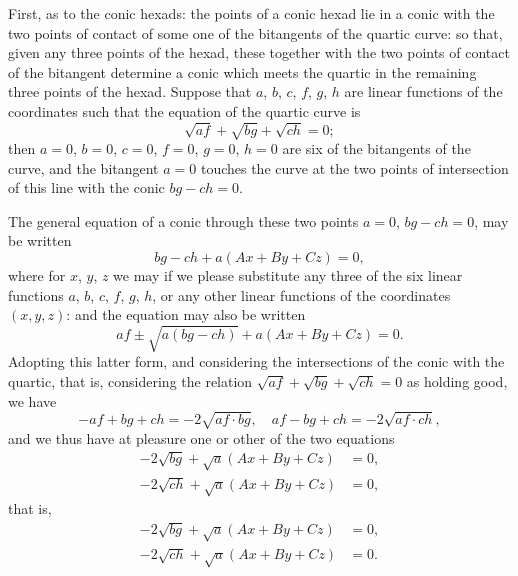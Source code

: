 \documentclass[11pt,a4paper]{article}
\begin{document}
\clearpage
First, as to the conic hexads: the points of a conic hexad lie in a conic with the two points of contact of some one of the bitangents of the quartic curve: so that, given any three points of the hexad, these together with the two points of contact of the bitangent determine a conic which meets the quartic in the remaining three points of the hexad. Suppose that $a$, $b$, $c$, $f$, $g$, $h$ are linear functions of the coordinates such that the equation of the quartic curve is
\[
\sqrt{af} + \sqrt{bg} + \sqrt{ch} = 0;
\]
then $a = 0$, $b = 0$, $c = 0$, $f = 0$, $g = 0$, $h = 0$ are six of the bitangents of the curve, and the bitangent $a = 0$ touches the curve at the two points of intersection of this line with the conic $bg - ch = 0$.

The general equation of a conic through these two points $a = 0$, $bg - ch = 0$, may be written
\[
bg - ch + a(Ax + By + Cz) = 0,
\]
where for $x$, $y$, $z$ we may if we please substitute any three of the six linear functions $a$, $b$, $c$, $f$, $g$, $h$, or any other linear functions of the coordinates $(x, y, z)$: and the equation may also be written
\[
af \pm \sqrt{a(bg - ch)} + a(Ax + By + Cz) = 0.
\]
Adopting this latter form, and considering the intersections of the conic with the quartic, that is, considering the relation $\sqrt{af} + \sqrt{bg} + \sqrt{ch} = 0$ as holding good, we have
\[
-af + bg + ch = -2\sqrt{af \cdot bg}, \quad af - bg + ch = -2\sqrt{af \cdot ch},
\]
and we thus have at pleasure one or other of the two equations
\begin{align*}
-2\sqrt{bg} + \sqrt{a}(Ax + By + Cz) &= 0, \\
-2\sqrt{ch} + \sqrt{a}(Ax + By + Cz) &= 0,
\end{align*}
that is,
\begin{align*}
-2\sqrt{bg} + \sqrt{a}(Ax + By + Cz) &= 0, \\
-2\sqrt{ch} + \sqrt{a}(Ax + By + Cz) &= 0.
\end{align*}
\end{document}
